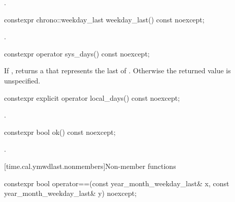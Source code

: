 \begin{itemdescr}
\pnum
\returns
{}.
\end{itemdescr}

%
\begin{itemdecl}
constexpr chrono::weekday_last weekday_last() const noexcept;
\end{itemdecl}

\begin{itemdescr}
\pnum
\returns
{}.
\end{itemdescr}

%
\begin{itemdecl}
constexpr operator sys_days() const noexcept;
\end{itemdecl}

\begin{itemdescr}
\pnum
\returns
If ,
returns a  that represents
the last  of .
Otherwise the returned value is unspecified.
\end{itemdescr}

%
\begin{itemdecl}
constexpr explicit operator local_days() const noexcept;
\end{itemdecl}

\begin{itemdescr}
\pnum
\returns
{}.
\end{itemdescr}

%
\begin{itemdecl}
constexpr bool ok() const noexcept;
\end{itemdecl}

\begin{itemdescr}
\pnum
\returns
{}.
\end{itemdescr}

[time.cal.ymwdlast.nonmembers]{Non-member functions}

%
\begin{itemdecl}
constexpr bool operator==(const year_month_weekday_last& x,
                          const year_month_weekday_last& y) noexcept;
\end{itemdecl}

